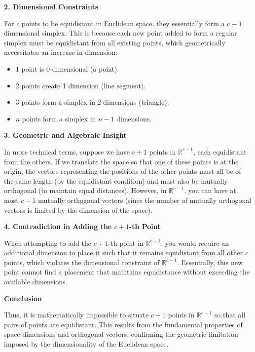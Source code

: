\documentclass[8pt]{article}
\begin{document}
\textbf{2. Dimensional Constraints}

For \(c\) points to be equidistant in Euclidean space, they essentially form a \(c-1\) dimensional simplex. This is because each new point added to form a regular simplex must be equidistant from all existing points, which geometrically necessitates an increase in dimension:

\begin{itemize}
    \item 1 point is 0-dimensional (a point).
    \item 2 points create 1 dimension (line segment).
    \item 3 points form a simplex in 2 dimensions (triangle).
    \item \(n\) points form a simplex in \(n-1\) dimensions.
\end{itemize}

\textbf{3. Geometric and Algebraic Insight}

In more technical terms, suppose we have \(c + 1\) points in \(\mathbb{R}^{c-1}\), each equidistant from the others. If we translate the space so that one of these points is at the origin, the vectors representing the positions of the other points must all be of the same length (by the equidistant condition) and must also be mutually orthogonal (to maintain equal distances). However, in \(\mathbb{R}^{c-1}\), you can have at most \(c-1\) mutually orthogonal vectors (since the number of mutually orthogonal vectors is limited by the dimension of the space).

\textbf{4. Contradiction in Adding the \(c+1\)-th Point}

When attempting to add the \(c+1\)-th point in \(\mathbb{R}^{c-1}\), you would require an additional dimension to place it such that it remains equidistant from all other \(c\) points, which violates the dimensional constraint of \(\mathbb{R}^{c-1}\). Essentially, this new point cannot find a placement that maintains equidistance without exceeding the available dimensions.

\textbf{Conclusion}

Thus, it is mathematically impossible to situate \(c+1\) points in \(\mathbb{R}^{c-1}\) so that all pairs of points are equidistant. This results from the fundamental properties of space dimensions and orthogonal vectors, confirming the geometric limitation imposed by the dimensionality of the Euclidean space.
\end{document}
